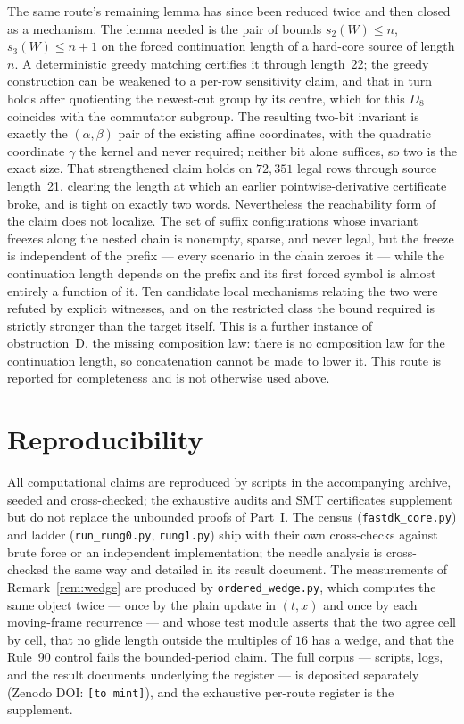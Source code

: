 \documentclass[11pt]{article}
\theoremstyle{definition}
\begin{document}
The same route's remaining lemma has since been reduced twice and then closed as
a mechanism. The lemma needed is the pair of bounds $s_2(W)\le n$,
$s_3(W)\le n+1$ on the forced continuation length of a hard-core source of
length $n$. A deterministic greedy matching certifies it through length~22; the
greedy construction can be weakened to a per-row sensitivity claim, and that in
turn holds after quotienting the newest-cut group by its centre, which for this
$D_8$ coincides with the commutator subgroup. The resulting two-bit invariant is
exactly the $(\alpha,\beta)$ pair of the existing affine coordinates, with the
quadratic coordinate $\gamma$ the kernel and never required; neither bit alone
suffices, so two is the exact size. That strengthened claim holds on $72{,}351$
legal rows through source length~21, clearing the length at which an earlier
pointwise-derivative certificate broke, and is tight on exactly two words.
Nevertheless the reachability form of the claim does not localize. The set of
suffix configurations whose invariant freezes along the nested chain is
nonempty, sparse, and never legal, but the freeze is independent of the prefix
--- every scenario in the chain zeroes it --- while the continuation length
depends on the prefix and its first forced symbol is almost entirely a function
of it. Ten candidate local mechanisms relating the two were refuted by explicit
witnesses, and on the restricted class the bound required is strictly stronger
than the target itself. This is a further instance of obstruction~D, the missing
composition law: there is no composition law for the continuation length, so
concatenation cannot be made to lower it. This route is reported for
completeness and is not otherwise used above.

\section{Reproducibility}
\label{sec:repro}

All computational claims are reproduced by scripts in the accompanying archive,
seeded and cross-checked; the exhaustive audits and SMT certificates supplement
but do not replace the unbounded proofs of Part~I. The census
(\texttt{fastdk\_core.py}) and ladder (\texttt{run\_rung0.py},
\texttt{rung1.py}) ship with their own cross-checks against brute force or an
independent implementation; the needle analysis is cross-checked the same way
and detailed in its result document. The measurements of Remark~\ref{rem:wedge}
are produced by \texttt{ordered\_wedge.py}, which computes the same object twice
--- once by the plain update in $(t,x)$ and once by each moving-frame recurrence
--- and whose test module asserts that the two agree cell by cell, that no glide
length outside the multiples of $16$ has a wedge, and that the Rule~90 control
fails the bounded-period claim. The full
corpus --- scripts, logs, and the result documents underlying the register ---
is deposited separately (Zenodo DOI: \texttt{[to mint]}), and the exhaustive
per-route register is the supplement.
\end{document}
